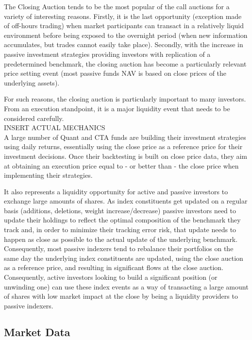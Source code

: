 The Closing Auction tends to be the most popular of the call auctions for a variety of interesting reasons. Firstly, it is the last opportunity (exception made of off-hours trading) when market participants can transact in a relatively liquid environment before being exposed to the overnight period (when new information accumulates, but trades cannot easily take place). Secondly, with the increase in passive investment strategies providing investors with replication of a predetermined benchmark, the closing auction has become a particularly relevant price setting event (most passive funds NAV is based on close prices of the underlying assets). 

For such reasons, the closing auction is particularly important to many investors. From an execution standpoint, it is a major liquidity event that needs to be considered carefully. \\

INSERT ACTUAL MECHANICS \\

A large number of Quant and CTA funds are building their investment strategies using daily returns, essentially using the close price as a reference price for their investment decisions. Once their backtesting is built on close price data, they aim at obtaining an execution price equal to - or better than - the close price when implementing their strategies. 

It also represents a liquidity opportunity for active and passive investors to exchange large amounts of shares. As index constituents get updated on a regular basis (additions, deletions, weight increase/decrease) passive investors need to update their holdings to reflect the optimal composition of the benchmark they track and, in order to minimize their tracking error risk, that update needs to happen as close as possible to the actual update of the underlying benchmark. Consequently, most passive indexers tend to rebalance their portfolios on the same day the underlying index constituents are updated, using the close auction as a reference price, and resulting in significant flows at the close auction. Consequently, active investors looking to build a significant position (or unwinding one) can use these index events as a way of transacting a large amount of shares with low market impact at the close by being a liquidity providers to passive indexers.  



\subsection{Market Data}

